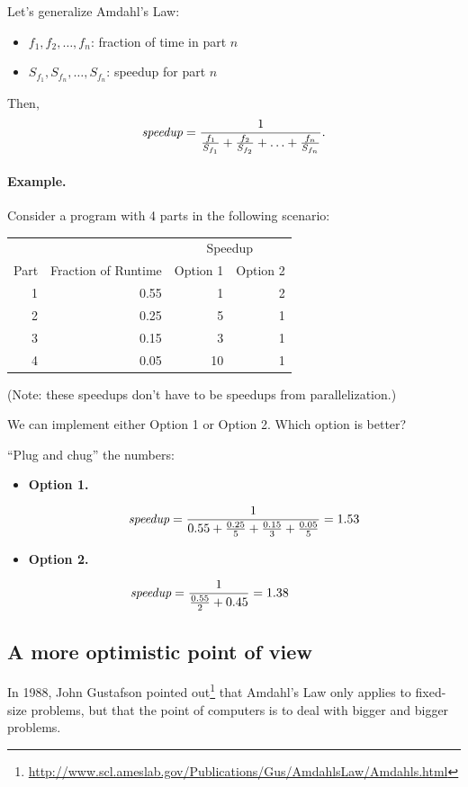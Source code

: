 \documentclass[a4paper]{report}
\begin{document}
Let's generalize Amdahl's Law:

\begin{itemize}
\item  $f_1, f_2, \ldots, f_n$: fraction of time in part $n$
\item  $S_{f_1}, S_{f_n}, \ldots, S_{f_n}$: speedup for part $n$
\end{itemize}

Then,
\[\mbox{\em speedup} = \frac{1}{\frac{f_1}{S_{f_1}} + \frac{f_2}{S_{f_2}} + \ldots +
     \frac{f_n}{S_{f_n}}}.\]

\paragraph{Example.} Consider a program with 4 parts in the following scenario:

\begin{center}
     \begin{tabular}{r|r|r|r}
     \multicolumn{2}{l}{} & \multicolumn{2}{|c}{Speedup} \\
     Part & Fraction of Runtime & Option 1 & Option 2\\
     \hline
     1 & 0.55 & 1  & 2\\
     2 & 0.25 & 5  & 1\\
     3 & 0.15 & 3  & 1\\
     4 & 0.05  & 10 & 1\\
     \end{tabular}
 \end{center}

     (Note: these speedups don't have to be speedups from parallelization.)
    
   We can implement either Option 1 or Option 2. 
   Which option is better?

   ``Plug and chug'' the numbers:
 \begin{itemize}
 \item  {\bf Option 1.}

   \[ \mbox{\em speedup} = \frac{1}{0.55 + \frac{0.25}{5} + \frac{0.15}{3} + \frac{0.05}{5}}
     = 1.53  \]

 \item  {\bf Option 2.}

   \[\mbox{\em speedup} = \frac{1}{\frac{0.55}{2} + 0.45} = 1.38 \hspace*{5.5em}\]
\end{itemize}

\subsection*{A more optimistic point of view}
In 1988, John Gustafson pointed
out\footnote{\url{http://www.scl.ameslab.gov/Publications/Gus/AmdahlsLaw/Amdahls.html}}
that Amdahl's Law only applies to fixed-size problems, but that the
point of computers is to deal with bigger and bigger problems.
\end{document}

